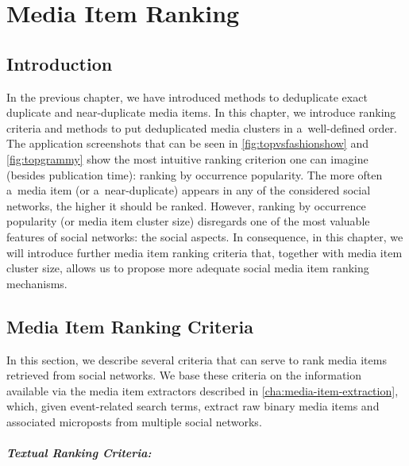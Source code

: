 \chapter{Media Item Ranking}
\label{cha:media-item-ranking}

\ifpdf
    \graphicspath{{8_media_item_ranking/figures/PNG/}{8_media_item_ranking/figures/PDF/}{8_media_item_ranking/figures/}}
\else
    \graphicspath{{8_media_item_ranking/figures/EPS/}{8_media_item_ranking/figures/}}
\fi

\section{Introduction}

In the previous chapter, we have introduced methods
to deduplicate exact duplicate and near-duplicate media items.
In this chapter, we introduce ranking criteria and methods
to put deduplicated media clusters in a~well-defined order.
The application screenshots that can be seen in \autoref{fig:topvsfashionshow}
and \autoref{fig:topgrammy} show the
most intuitive ranking criterion one can imagine (besides publication time):
ranking by occurrence popularity.
The more often a~media item (or a~near-duplicate)
appears in any of the considered social networks, 
the higher it should be ranked.
However, ranking by occurrence popularity (or media item cluster size)
disregards one of the most valuable features of social networks: 
the social aspects.
In consequence, in this chapter, we will introduce
further media item ranking criteria that,
together with media item cluster size,
allows us to propose more adequate social media item ranking mechanisms.

\section{Media Item Ranking Criteria}

In this section, we describe several criteria that can serve to rank
media items retrieved from social networks. 
We base these criteria on the information available via
the media item extractors described in \autoref{cha:media-item-extraction},
which, given event-related search terms,
extract raw binary media items and associated microposts
from multiple social networks.

\paragraph{Textual Ranking Criteria:}

